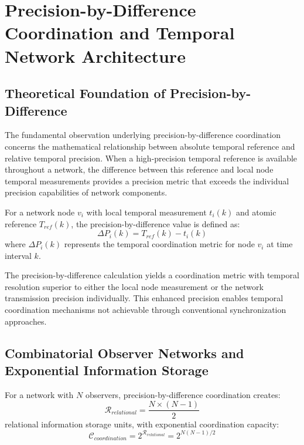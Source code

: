 ﻿\documentclass[11pt,a4paper]{article}
\begin{document}
\section{Precision-by-Difference Coordination and Temporal Network Architecture}

\subsection{Theoretical Foundation of Precision-by-Difference}

The fundamental observation underlying precision-by-difference coordination concerns the mathematical relationship between absolute temporal reference and relative temporal precision. When a high-precision temporal reference is available throughout a network, the difference between this reference and local node temporal measurements provides a precision metric that exceeds the individual precision capabilities of network components.

\begin{definition}
For a network node $v_i$ with local temporal measurement $t_i(k)$ and atomic reference $T_{ref}(k)$, the precision-by-difference value is defined as:
\begin{equation}
\Delta P_i(k) = T_{ref}(k) - t_i(k)
\label{eq:precision_difference}
\end{equation}
where $\Delta P_i(k)$ represents the temporal coordination metric for node $v_i$ at time interval $k$.
\end{definition}

The precision-by-difference calculation yields a coordination metric with temporal resolution superior to either the local node measurement or the network transmission precision individually. This enhanced precision enables temporal coordination mechanisms not achievable through conventional synchronization approaches.

\subsection{Combinatorial Observer Networks and Exponential Information Storage}

\begin{theorem}
For a network with $N$ observers, precision-by-difference coordination creates:
\begin{equation}
\mathcal{R}_{relational} = \frac{N \times (N-1)}{2}
\end{equation}
relational information storage units, with exponential coordination capacity:
\begin{equation}
\mathcal{C}_{coordination} = 2^{\mathcal{R}_{relational}} = 2^{N(N-1)/2}
\end{equation}
\end{theorem}
\end{document}
